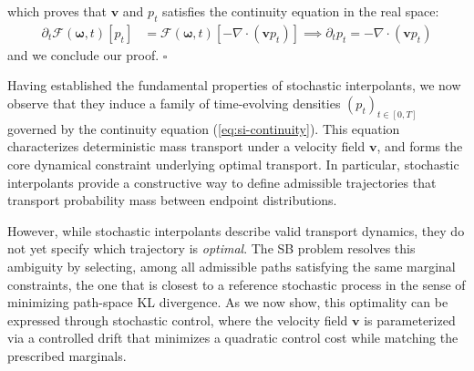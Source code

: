 \documentclass{article}
\begin{document}
which proves that $\boldsymbol{v}$ and $p_t$ satisfies the continuity equation in the real space:
\begin{align}
    \partial_t\mathcal{F}(\boldsymbol{\omega},t)[p_t]&=\mathcal{F}(\boldsymbol{\omega},t)[-\nabla \cdot (\boldsymbol{v}p_t)]\implies \boxed{\partial_tp_t=-\nabla\cdot (\boldsymbol{v}p_t)}
\end{align}
and we conclude our proof. \hfill $\square$

Having established the fundamental properties of stochastic interpolants, we now observe that they induce a family of time-evolving densities $(p_t)_{t\in[0,T]}$ governed by the continuity equation (\ref{eq:si-continuity}). This equation characterizes deterministic mass transport under a velocity field $\boldsymbol{v}$, and forms the core dynamical constraint underlying optimal transport. In particular, stochastic interpolants provide a constructive way to define admissible trajectories that transport probability mass between endpoint distributions.

However, while stochastic interpolants describe valid transport dynamics, they do not yet specify which trajectory is \textit{optimal}. The SB problem resolves this ambiguity by selecting, among all admissible paths satisfying the same marginal constraints, the one that is closest to a reference stochastic process in the sense of minimizing path-space KL divergence. As we now show, this optimality can be expressed through stochastic control, where the velocity field $\boldsymbol{v}$ is parameterized via a controlled drift that minimizes a quadratic control cost while matching the prescribed marginals.
\end{document}
